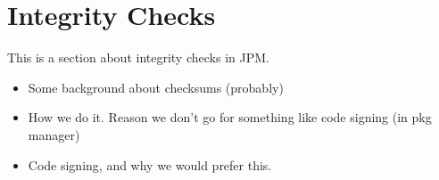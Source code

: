 
\section{Integrity Checks}

This is a section about integrity checks in JPM.

\begin{itemize}
    \item Some background about checksums (probably)
    \item How we do it. Reason we don't go for something like code signing
        (in pkg manager)
    \item Code signing, and why we would prefer this.
\end{itemize}
